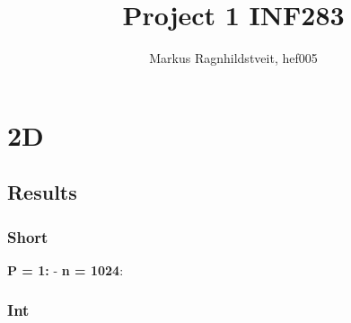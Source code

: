 \documentclass[a4paper]{extarticle}
\title{Project 1 INF283}
\author{Markus Ragnhildstveit, hef005}
\begin{document}
\maketitle

\tableofcontents
\newpage


\section{2D}

\subsection{Results}
\subsubsection{Short}
\textbf{P = 1:}
- \textbf{n = 1024}: 



\subsubsection{Int}
\end{document}
